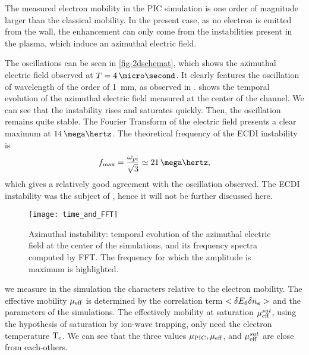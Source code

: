   The measured electron mobility in the \ac{PIC} simulation is one order of magnitude larger than the classical mobility.
  In the present case, as no electron is emitted from the wall, the enhancement can only come from the instabilities present in the plasma, which induce an azimuthal electric field.

  The oscillations can be seen in \cref{fig-2dschemat}, which shows the azimuthal electric field observed at $T=4\,\micro\second$.
  It clearly features the oscillation of wavelength of the order of 1~mm, as observed in \citet{heron2013,janhunen2018}.
   shows the temporal evolution of the azimuthal electric field measured at the center of the channel.
  We can see that the instability rises and saturates quickly.
  Then, the oscillation remains quite stable.
  The Fourier Transform of the electric field presents a clear maximum at $14\,\mega\hertz$.
  The theoretical frequency of the \ac{ECDI} instability is \citep{lafleur2017}
  \begin{equation} \label{eq-maxfeq}
    f_{\rm max} = \frac{\omega_{pi}}{\sqrt{3}} \simeq 21 \,\mega\hertz,
  \end{equation}
  which gives a relatively good agreement with the oscillation observed.
  The \ac{ECDI} instability was the subject of , hence it will not be further discussed here.
  
  
  \begin{figure}[hbt]
    \centering
    \texttt{[image: time\_and\_FFT]}
    \caption{Azimuthal instability\string: temporal evolution of the azimuthal electric field at the center of the simulations, and its frequency spectra computed by \acs{FFT}. The frequency for which the amplitude is maximum is highlighted.}
    \label{fig-exampleECDI}
  \end{figure}
  
  we measure in the simulation the characters relative to the electron mobility.
  The effective mobility $\mu_{\mathrm{eff}}$ is determined by the correlation term $<\delta E_{\theta} \delta n_e>$ and the parameters of the simulations.
  The effectively mobility at saturation $\mu_{\mathrm{eff}}^{sat}$, using the hypothesis of saturation by ion-wave trapping, only need the electron temperature $\mathrm{T_e}$.
  We can see that the three values $\mu_{\mathrm{PIC}}, \mu_{\mathrm{eff}}$, and $\mu_{\mathrm{eff}}^{sat}$ are close from each-others.
  
